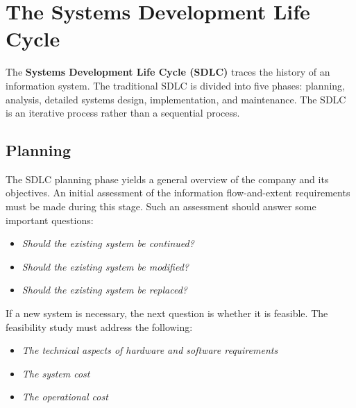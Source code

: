 \documentclass[a4paper, 12pt, titlepage]{report}
\begin{document}
\section{The Systems Development Life Cycle}
The \textbf{Systems Development Life Cycle (SDLC)} traces the history of an information system. The traditional SDLC is divided into five phases: planning, analysis, detailed systems design, implementation, and maintenance. The SDLC is an iterative process rather than a sequential process.

\subsection{Planning}
The SDLC planning phase yields a general overview of the company and its objectives. An initial assessment of the information flow-and-extent requirements must be made during this stage. Such an assessment should answer some important questions:
\begin{itemize}
\item \emph{Should the existing system be continued?}
\item \emph{Should the existing system be modified?}
\item \emph{Should the existing system be replaced?}
\end{itemize}
If a new system is necessary, the next question is whether it is feasible. The feasibility study must address the following:
\begin{itemize}
\item \emph{The technical aspects of hardware and software requirements}
\item \emph{The system cost}
\item \emph{The operational cost}
\end{itemize}
\end{document}
